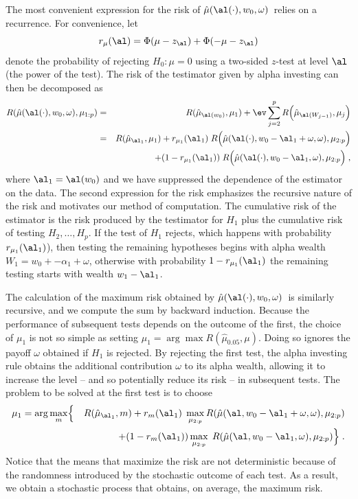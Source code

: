\documentclass[12pt]{article}
\newcommand{\test}{\mbox{$\hat\mu(\al(\cdot),w_0,\omega)$}}
\begin{document}
 The most convenient expression for the risk of \test\ relies on a recurrence.
  For convenience, let
 \begin{equation}
   r_\mu(\al) = \Phi(\mu-z_\al)+\Phi(-\mu-z_\al)   
 \label{eq:rMu}
 \end{equation}
 denote the probability of rejecting $H_0: \mu=0$ using a two-sided $z$-test at
 level $\al$ (the power of the test).  The risk of the testimator given by alpha
 investing can then be decomposed as
 \begin{eqnarray}
   R(\hat\mu(\al(\cdot),w_0,\omega),\mu_{1:p}) 
    &=& R(\hat\mu_{\al(w_0)},\mu_1)
        + \ev \sum_{j=2}^p R\Bigl(\hat\mu_{\al(W_{j-1})},\mu_j\Bigr)  \cr
    &=& R(\hat\mu_{\al_1},\mu_1)
        + r_{\mu_1}(\al_1)\; 
          R\Bigl(\hat\mu(\al(\cdot),w_0-\al_1+\omega,\omega),\mu_{2:p}\Bigr)\cr
    & & \qquad + (1-r_{\mu_1}(\al_1))\; 
          R\Bigl(\hat\mu(\al(\cdot),w_0-\al_1,\omega),\mu_{2:p}\Bigr) \;,
 \label{eq:RMuHat}
 \end{eqnarray}
 where $\al_1 = \al(w_0)$ and we have suppressed the dependence of the estimator
 on the data.  The second expression for the risk emphasizes the recursive
 nature of the risk and motivates our method of computation.  The cumulative
 risk of the estimator is the risk produced by the testimator for $H_1$ plus the
 cumulative risk of testing $H_2, \ldots, H_p$.  If the test of $H_1$ rejects,
 which happens with probability $r_{\mu_1}(\al_1)$), then testing the remaining
 hypotheses begins with alpha wealth $W_1 = w_0 + -\alpha_1 + \omega$, otherwise
 with probability $1- r_{\mu_1}(\al_1)$ the remaining testing starts with wealth
 $w_1 - \al_1$.


 The calculation of the maximum risk obtained by \test\ is similarly recursive,
 and we compute the sum by backward induction.  Because the performance of
 subsequent tests depends on the outcome of the first, the choice of $\mu_1$ is
 not so simple as setting $\mu_1 = \arg \max R(\hat\mu_{0.05}, \mu)$.  Doing so
 ignores the payoff $\omega$ obtained if $H_1$ is rejected.  By rejecting the
 first test, the alpha investing rule obtains the additional contribution
 $\omega$ to its alpha wealth, allowing it to increase the level -- and so
 potentially reduce its risk -- in subsequent tests.  The problem to be solved
 at the first test is to choose
 \begin{eqnarray*}
    \mu_1 = \arg \max_{m} & \Bigl\{ & R(\hat\mu_{\al_1},m) \Bigr. 
        + r_{m}(\al_1) \; \max_{\mu_{2:p}} 
              R(\hat\mu(\al,w_0-\al_1+\omega,\omega),\mu_{2:p})\cr
    & & + \Bigl. (1-r_{m}(\al_1)) \max_{\mu_{2:p}} \; 
              R(\hat\mu(\al,w_0-\al_1,\omega),\mu_{2:p}) \Bigr\} \;.
 \end{eqnarray*}
 Notice that the means that maximize the risk are not deterministic because of
 the randomness introduced by the stochastic outcome of each test.  As a result,
 we obtain a stochastic process that obtains, on average, the maximum risk. 
\end{document}
